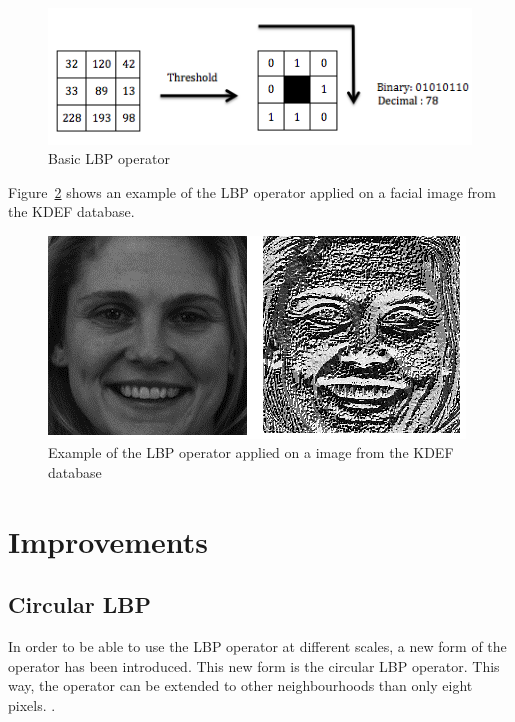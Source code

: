 \begin{figure}[!h]
\begin{center}
\noindent \includegraphics[scale=1]{figures/lbp_basic_operator} 
\newline
\caption{Basic LBP operator}
\label{lbp_basic_operator}
\end{center} 
\end{figure}

\noindent Figure~\ref{lbp_basic_operator_example} shows an example of the LBP operator applied on a facial image from the KDEF database.
\newline

\begin{figure}[!h]
\begin{center}
\noindent \includegraphics[scale=0.8]{figures/lbp_basic_operator_example} 
\newline
\caption{Example of the LBP operator applied on a image from the KDEF database}
\label{lbp_basic_operator_example}
\end{center} 
\end{figure}

\section{Improvements}

\subsection{Circular LBP}

\vspace{\baselineskip}
\noindent In order to be able to use the LBP operator at different scales, a new form of the operator has been introduced. This new form is the circular LBP operator. This way, the operator can be extended to other neighbourhoods than only eight pixels. \cite{GAN08}.
\newline

